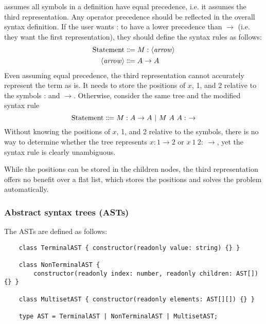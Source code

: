 \projectname{} assumes all symbols in a definition have equal precedence, i.e. it assumes the third representation. Any operator precedence should be reflected in the overall syntax definition. If the user wants : to have a lower precedence than $\to$ (i.e. they want the first representation), they should define the syntax rules as follows:
\begin{align*}
    \text{Statement} &\Coloneqq M: \langle\mathit{arrow}\rangle \\
    \langle\mathit{arrow}\rangle &\Coloneqq A \to A
\end{align*}
Even assuming equal precedence, the third representation cannot accurately represent the term as is. It needs to store the positions of $x$, 1, and 2 relative to the symbols : and $\to$. Otherwise, consider the same tree and the modified syntax rule
\[
    \text{Statement} \Coloneqq M: A \to A \alt M\ A\ A :\ \to
\]
Without knowing the positions of $x$, 1, and 2 relative to the symbols, there is no way to determine whether the tree represents $x: 1 \to 2$ or $x\ 1\ 2:\ \to$, yet the syntax rule is clearly unambiguous.

While the positions can be stored in the children nodes, the third representation offers no benefit over a flat list, which stores the positions and solves the problem automatically.

\subsubsection{Abstract syntax trees (ASTs)}
The ASTs are defined as follows:
\begin{lstlisting}
    class TerminalAST { constructor(readonly value: string) {} }

    class NonTerminalAST {
        constructor(readonly index: number, readonly children: AST[]) {} }

    class MultisetAST { constructor(readonly elements: AST[][]) {} }

    type AST = TerminalAST | NonTerminalAST | MultisetAST;
\end{lstlisting}

